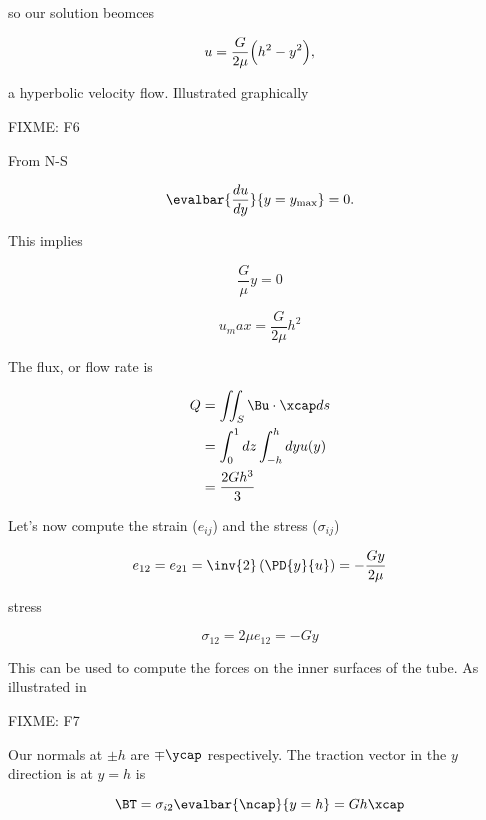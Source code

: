 so our solution beomces

\begin{equation}\label{eqn:continuumL11:690}
u = \frac{G}{2 \mu} \Bigl( h^2 - y^2 \Bigr),
\end{equation}

a hyperbolic velocity flow.  Illustrated graphically

FIXME: F6

From N-S

\begin{equation}\label{eqn:continuumL11:710}
\evalbar{\frac{du}{dy}}{y = y_{\text{max}}} = 0.
\end{equation}

This implies

\begin{equation}\label{eqn:continuumL11:830}
\frac{G}{\mu} y = 0
\end{equation}

\begin{equation}\label{eqn:continuumL11:850}
u_max = \frac{G}{2\mu} h^2
\end{equation}

The flux, or flow rate is

\begin{align*}
Q 
&= \iint_S \Bu \cdot \xcap ds \\
&= \int_0^1 dz \int_{-h}^h dy u(y) \\
&=
\frac{2 G h^3}{3}
\end{align*}

Let's now compute the strain ($e_{ij}$) and the stress ($\sigma_{ij}$)

\begin{equation}\label{eqn:continuumL11:730}
e_{12} = e_{21} = \inv{2} \left( \PD{y}{u} \right) = - \frac{G y}{2 \mu}
\end{equation}

stress

\begin{equation}\label{eqn:continuumL11:750}
\sigma_{12} = 2 \mu e_{12} = -G y
\end{equation}

This can be used to compute the forces on the inner surfaces of the tube.  As illustrated in

FIXME: F7

Our normals at $\pm h$ are $\mp \ycap$ respectively.  The traction vector in the $y$ direction is at $y = h$ is

\begin{equation}\label{eqn:continuumL11:770}
\BT = \sigma_{i 2} \evalbar{\ncap}{y = h} = G h \xcap
\end{equation}

